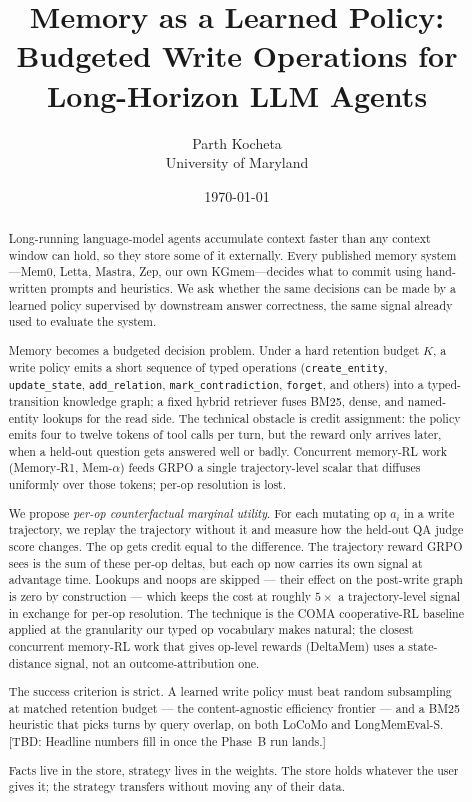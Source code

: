 \documentclass[11pt]{article}
\title{\bfseries Memory as a Learned Policy:\\
\large Budgeted Write Operations for Long-Horizon LLM Agents}
\author{Parth Kocheta\\\small University of Maryland}
\date{\today}
\newcommand{\TBD}[1]{%
  \textcolor{red!80!black}{\textsf{[TBD: #1]}}}
\begin{document}
\maketitle

\begin{abstract}
Long-running language-model agents accumulate context faster than any
context window can hold, so they store some of it externally. Every
published memory system---Mem0, Letta, Mastra, Zep, our own
KGmem---decides what to commit using hand-written prompts and
heuristics. We ask whether the same decisions can be made by a learned
policy supervised by downstream answer correctness, the same signal
already used to evaluate the system.

Memory becomes a budgeted decision problem. Under a hard retention
budget $K$, a write policy emits a short sequence of typed operations
(\texttt{create\_entity}, \texttt{update\_state}, \texttt{add\_relation},
\texttt{mark\_contradiction}, \texttt{forget}, and others) into a
typed-transition knowledge graph; a fixed hybrid retriever fuses BM25,
dense, and named-entity lookups for the read side. The technical
obstacle is credit assignment: the policy emits four to twelve tokens
of tool calls per turn, but the reward only arrives later, when a
held-out question gets answered well or badly. Concurrent memory-RL
work (Memory-R1, Mem-$\alpha$) feeds GRPO a single trajectory-level
scalar that diffuses uniformly over those tokens; per-op resolution is
lost.

We propose \emph{per-op counterfactual marginal utility}. For each
mutating op $a_i$ in a write trajectory, we replay the trajectory
without it and measure how the held-out QA judge score changes. The op
gets credit equal to the difference. The trajectory reward GRPO sees is
the sum of these per-op deltas, but each op now carries its own
signal at advantage time. Lookups and noops are skipped --- their
effect on the post-write graph is zero by construction --- which keeps
the cost at roughly $5\times$ a trajectory-level signal in exchange
for per-op resolution. The technique is the COMA cooperative-RL
baseline applied at the granularity our typed op vocabulary makes
natural; the closest concurrent memory-RL work that gives op-level
rewards (DeltaMem) uses a state-distance signal, not an
outcome-attribution one.

The success criterion is strict. A learned write policy must beat
random subsampling at matched retention budget --- the content-agnostic
efficiency frontier --- and a BM25 heuristic that picks turns by query
overlap, on both LoCoMo and LongMemEval-S. \TBD{Headline numbers fill
in once the Phase~B run lands.}

Facts live in the store, strategy lives in the weights. The store
holds whatever the user gives it; the strategy transfers without
moving any of their data.
\end{abstract}
\end{document}

